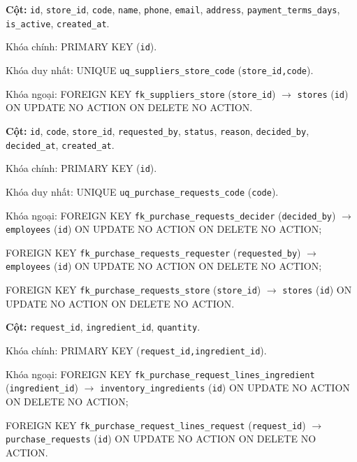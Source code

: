 \begin{description}[leftmargin=3.6cm,labelwidth=3.4cm,style=nextline]

\item[\texttt{suppliers}] \textbf{Cột:} \texttt{id}, \texttt{store\_id}, \texttt{code}, \texttt{name}, \texttt{phone}, \texttt{email}, \texttt{address}, \texttt{payment\_terms\_days}, \texttt{is\_active}, \texttt{created\_at}.

Khóa chính: PRIMARY KEY (\texttt{id}).

Khóa duy nhất: UNIQUE \texttt{uq\_suppliers\_store\_code} (\texttt{store\_id,code}).

Khóa ngoại: FOREIGN KEY \texttt{fk\_suppliers\_store} (\texttt{store\_id}) $\rightarrow$ \texttt{stores} (\texttt{id}) ON UPDATE NO ACTION ON DELETE NO ACTION.

\item[\texttt{purchase\_requests}] \textbf{Cột:} \texttt{id}, \texttt{code}, \texttt{store\_id}, \texttt{requested\_by}, \texttt{status}, \texttt{reason}, \texttt{decided\_by}, \texttt{decided\_at}, \texttt{created\_at}.

Khóa chính: PRIMARY KEY (\texttt{id}).

Khóa duy nhất: UNIQUE \texttt{uq\_purchase\_requests\_code} (\texttt{code}).

Khóa ngoại: FOREIGN KEY \texttt{fk\_purchase\_requests\_decider} (\texttt{decided\_by}) $\rightarrow$ \texttt{employees} (\texttt{id}) ON UPDATE NO ACTION ON DELETE NO ACTION;\par FOREIGN KEY \texttt{fk\_purchase\_requests\_requester} (\texttt{requested\_by}) $\rightarrow$ \texttt{employees} (\texttt{id}) ON UPDATE NO ACTION ON DELETE NO ACTION;\par FOREIGN KEY \texttt{fk\_purchase\_requests\_store} (\texttt{store\_id}) $\rightarrow$ \texttt{stores} (\texttt{id}) ON UPDATE NO ACTION ON DELETE NO ACTION.

\item[\texttt{purchase\_request\_lines}] \textbf{Cột:} \texttt{request\_id}, \texttt{ingredient\_id}, \texttt{quantity}.

Khóa chính: PRIMARY KEY (\texttt{request\_id,ingredient\_id}).

Khóa ngoại: FOREIGN KEY \texttt{fk\_purchase\_request\_lines\_ingredient} (\texttt{ingredient\_id}) $\rightarrow$ \texttt{inventory\_ingredients} (\texttt{id}) ON UPDATE NO ACTION ON DELETE NO ACTION;\par FOREIGN KEY \texttt{fk\_purchase\_request\_lines\_request} (\texttt{request\_id}) $\rightarrow$ \texttt{purchase\_requests} (\texttt{id}) ON UPDATE NO ACTION ON DELETE NO ACTION.


\end{description}
